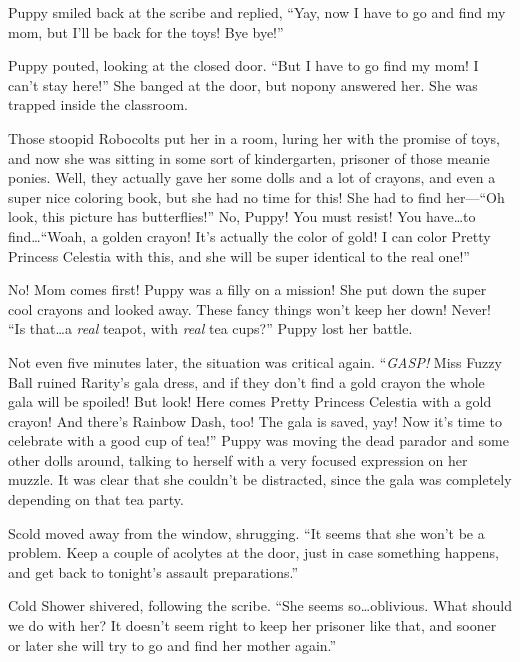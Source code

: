 Puppy smiled back at the scribe and replied, ``Yay, now I have to go and find my mom, but I'll be back for the toys! Bye bye!''



\horizonline


Puppy pouted, looking at the closed door. ``But I have to go find my mom! I can't stay here!'' She banged at the door, but nopony answered her. She was trapped inside the classroom.

Those stoopid Robocolts put her in a room, luring her with the promise of toys, and now she was sitting in some sort of kindergarten, prisoner of those meanie ponies. Well, they actually gave her some dolls and a lot of crayons, and even a super nice coloring book, but she had no time for this! She had to find her---``Oh look, this picture has butterflies!'' No, Puppy! You must resist! You have\dots to find\dots ``Woah, a golden crayon! It's actually the color of gold! I can color Pretty Princess Celestia with this, and she will be super identical to the real one!''

No! Mom comes first! Puppy was a filly on a mission! She put down the super cool crayons and looked away. These fancy things won't keep her down! Never! ``Is that\dots a \emph{real} teapot, with \emph{real} tea cups?'' Puppy lost her battle.

Not even five minutes later, the situation was critical again. ``\emph{GASP!} Miss Fuzzy Ball ruined Rarity's gala dress, and if they don't find a gold crayon the whole gala will be spoiled! But look! Here comes Pretty Princess Celestia with a gold crayon! And there's Rainbow Dash, too! The gala is saved, yay! Now it's time to celebrate with a good cup of tea!'' Puppy was moving the dead parador and some other dolls around, talking to herself with a very focused expression on her muzzle. It was clear that she couldn't be distracted, since the gala was completely depending on that tea party.

Scold moved away from the window, shrugging. ``It seems that she won't be a problem. Keep a couple of acolytes at the door, just in case something happens, and get back to tonight's assault preparations.''

Cold Shower shivered, following the scribe. ``She seems so\dots oblivious. What should we do with her? It doesn't seem right to keep her prisoner like that, and sooner or later she will try to go and find her mother again.''

